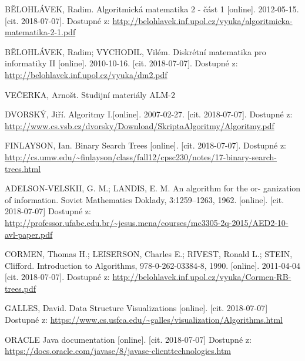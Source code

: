 \documentclass[
  biblatex=false,
  font=serif,
  glossaries=false,
  tables=false,
  theorems=false,
  index
]{kidiplom}
\begin{document}
\begin{thebibliography}{99}	

 \uppercase{BĚlohlávek}, Radim. Algoritmická matematika 2 - část 1 [online]. 2012-05-15. [cit. 2018-07-07]. Dostupné z: \url{http://belohlavek.inf.upol.cz/vyuka/algoritmicka-matematika-2-1.pdf}

 \uppercase{BĚlohlávek}, Radim; \uppercase{Vychodil}, Vilém. Diskrétní matematika pro informatiky II [online]. 2010-10-16. [cit. 2018-07-07]. Dostupné z: \url{http://belohlavek.inf.upol.cz/vyuka/dm2.pdf}

 \uppercase{veČerka}, Arnošt. Studijní materiály ALM-2

 \uppercase{DvorskÝ}, Jiří. Algoritmy I.[online]. 2007-02-27. [cit. 2018-07-07]. Dostupné z: \url{http://www.cs.vsb.cz/dvorsky/Download/SkriptaAlgoritmy/Algoritmy.pdf}

 \uppercase{Finlayson}, Ian. Binary Search Trees [online]. [cit. 2018-07-07].
Dostupné z: \url{http://cs.umw.edu/~finlayson/class/fall12/cpsc230/notes/17-binary-search-trees.html}

 \uppercase{Adelson-Velskii}, G. M.; \uppercase{Landis}, E. M. An algorithm for the or-
ganization of information. Soviet Mathematics Doklady, 3:1259–1263, 1962. [online]. [cit. 2018-07-07] Dostupné z: \url{http://professor.ufabc.edu.br/~jesus.mena/courses/mc3305-2q-2015/AED2-10-avl-paper.pdf}

 \uppercase{Cormen}, Thomas H.; \uppercase{Leiserson}, Charles E.; \uppercase{Rivest}, Ronald L.; \uppercase{Stein}, Clifford. Introduction to Algorithms, 978-0-262-03384-8, 1990. [online]. 2011-04-04  [cit. 2018-07-07]. Dostupné z: \url{http://belohlavek.inf.upol.cz/vyuka/Cormen-RB-trees.pdf}

 \uppercase{Galles}, David. Data Structure Visualizations [online]. [cit. 2018-07-07]
Dostupné z: \url{https://www.cs.usfca.edu/~galles/visualization/Algorithms.html}

 ORACLE Java documentation [online]. [cit. 2018-07-07] Dostupné z: \url{https://docs.oracle.com/javase/8/javase-clienttechnologies.htm}

\end{thebibliography}
\end{document}
